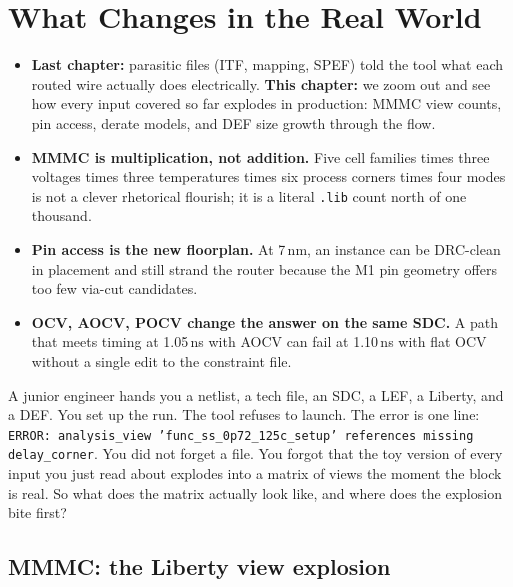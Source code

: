 \chapter{What Changes in the Real World}

\begin{tldr}
\begin{itemize}
  \item \textbf{Last chapter:} parasitic files (ITF, mapping, SPEF) told the tool what each routed wire actually does electrically. \textbf{This chapter:} we zoom out and see how every input covered so far explodes in production: MMMC view counts, pin access, derate models, and DEF size growth through the flow.
  \item \textbf{MMMC is multiplication, not addition.} Five cell families times three voltages times three temperatures times six process corners times four modes is not a clever rhetorical flourish; it is a literal \texttt{.lib} count north of one thousand.
  \item \textbf{Pin access is the new floorplan.} At 7\,nm, an instance can be DRC-clean in placement and still strand the router because the M1 pin geometry offers too few via-cut candidates.
  \item \textbf{OCV, AOCV, POCV change the answer on the same SDC.} A path that meets timing at 1.05\,ns with AOCV can fail at 1.10\,ns with flat OCV without a single edit to the constraint file.
\end{itemize}
\end{tldr}

\begin{hook}
A junior engineer hands you a netlist, a tech file, an SDC, a LEF, a Liberty, and a DEF. You set up the run. The tool refuses to launch. The error is one line: \texttt{ERROR: analysis\_view 'func\_ss\_0p72\_125c\_setup' references missing delay\_corner}. You did not forget a file. You forgot that the toy version of every input you just read about explodes into a matrix of views the moment the block is real. So what does the matrix actually look like, and where does the explosion bite first?
\end{hook}

\section{MMMC: the Liberty view explosion}

